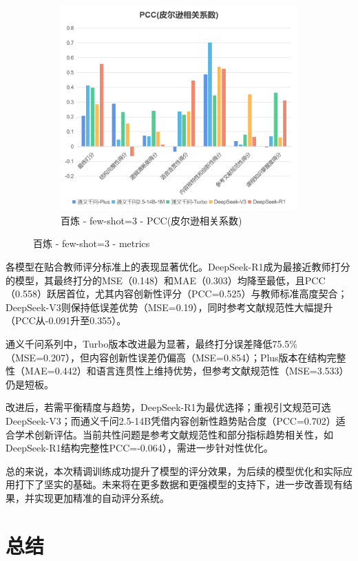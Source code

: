\documentclass{article}
\begin{document}
\begin{figure}[h!]
    \centering
	\begin{subfigure}{0.3\linewidth}
		\centering
		\includegraphics[width=0.9\linewidth]{img/bailian-fewShot3-PCC.png}
		\caption{百炼 - few-shot=3 - PCC(皮尔逊相关系数)}
		\label{fig:bailian-fewShot3-PCC}
	\end{subfigure}
	\caption{百炼 - few-shot=3 - metrics}
		\label{fig:bailian-fewShot3-metrics}
\end{figure}

各模型在贴合教师评分标准上的表现显著优化。DeepSeek-R1成为最接近教师打分的模型，其最终打分的MSE（0.148）和MAE（0.303）均降至最低，且PCC（0.558）跃居首位，尤其内容创新性评分（PCC=0.525）与教师标准高度契合；DeepSeek-V3则保持低误差优势（MSE=0.19），同时参考文献规范性大幅提升（PCC从-0.091升至0.355）。

通义千问系列中，Turbo版本改进最为显著，最终打分误差降低75.5\%（MSE=0.207），但内容创新性误差仍偏高（MSE=0.854）；Plus版本在结构完整性（MAE=0.442）和语言连贯性上维持优势，但参考文献规范性（MSE=3.533）仍是短板。

改进后，若需平衡精度与趋势，DeepSeek-R1为最优选择；重视引文规范可选DeepSeek-V3；而通义千问2.5-14B凭借内容创新性趋势贴合度（PCC=0.702）适合学术创新评估。当前共性问题是参考文献规范性和部分指标趋势相关性，如DeepSeek-R1结构完整性PCC=-0.064），需进一步针对性优化。 

总的来说，本次精调训练成功提升了模型的评分效果，为后续的模型优化和实际应用打下了坚实的基础。未来将在更多数据和更强模型的支持下，进一步改善现有结果，并实现更加精准的自动评分系统。

\section{总结}
\end{document}

